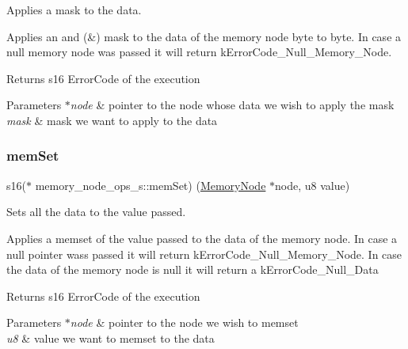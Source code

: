 Applies a mask to the data. 

Applies an and (\&) mask to the data of the memory node byte to byte. In case a null memory node was passed it will return k\+Error\+Code\+\_\+\+Null\+\_\+\+Memory\+\_\+\+Node. \begin{DoxyReturn}{Returns}
s16 Error\+Code of the execution 
\end{DoxyReturn}

\begin{DoxyParams}{Parameters}
{\em $\ast$node} & pointer to the node whose data we wish to apply the mask \\
\hline
{\em mask} & mask we want to apply to the data \\
\hline
\end{DoxyParams}
\mbox{\label{structmemory__node__ops__s_a25eeed1bed000ce61e20eb1889710be1}} 
\subsubsection{\texorpdfstring{mem\+Set}{memSet}}
{\footnotesize\ttfamily s16($\ast$ memory\+\_\+node\+\_\+ops\+\_\+s\+::mem\+Set) (\hyperlink{structmemory__node__s}{Memory\+Node} $\ast$node, u8 value)}



Sets all the data to the value passed. 

Applies a memset of the value passed to the data of the memory node. In case a null pointer wass passed it will return k\+Error\+Code\+\_\+\+Null\+\_\+\+Memory\+\_\+\+Node. In case the data of the memory node is null it will return a k\+Error\+Code\+\_\+\+Null\+\_\+\+Data

\begin{DoxyReturn}{Returns}
s16 Error\+Code of the execution 
\end{DoxyReturn}

\begin{DoxyParams}{Parameters}
{\em $\ast$node} & pointer to the node we wish to memset \\
\hline
{\em u8} & value we want to memset to the data \\
\hline
\end{DoxyParams}
\mbox{\label{structmemory__node__ops__s_a87ce72f198cd7c9df08a90d9cebbdde9}} 
